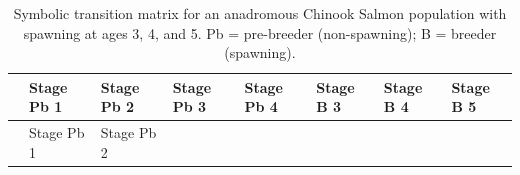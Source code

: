 \documentclass[
  letterpaper,
  DIV=11,
  numbers=noendperiod]{scrreprt}
\begin{document}
\begin{longtable}[]{@{}
  >{\raggedright\arraybackslash}p{}
  >{\raggedright\arraybackslash}p{}
  >{\raggedright\arraybackslash}p{}
  >{\raggedright\arraybackslash}p{}
  >{\raggedright\arraybackslash}p{}
  >{\raggedright\arraybackslash}p{}
  >{\raggedright\arraybackslash}p{}
  >{\raggedright\arraybackslash}p{}@{}}
\caption{Symbolic transition matrix for an anadromous Chinook Salmon
population with spawning at ages 3, 4, and 5. Pb = pre-breeder
(non-spawning); B = breeder (spawning).}\tabularnewline
\toprule\noalign{}
\begin{minipage}[b]{\linewidth}\raggedright
\end{minipage} & \begin{minipage}[b]{\linewidth}\raggedright
Stage Pb 1
\end{minipage} & \begin{minipage}[b]{\linewidth}\raggedright
Stage Pb 2
\end{minipage} & \begin{minipage}[b]{\linewidth}\raggedright
Stage Pb 3
\end{minipage} & \begin{minipage}[b]{\linewidth}\raggedright
Stage Pb 4
\end{minipage} & \begin{minipage}[b]{\linewidth}\raggedright
Stage B 3
\end{minipage} & \begin{minipage}[b]{\linewidth}\raggedright
Stage B 4
\end{minipage} & \begin{minipage}[b]{\linewidth}\raggedright
Stage B 5
\end{minipage} \\
\midrule\noalign{}
\endfirsthead
\toprule\noalign{}
\begin{minipage}[b]{\linewidth}\raggedright
\end{minipage} & \begin{minipage}[b]{\linewidth}\raggedright
Stage Pb 1
\end{minipage} & \begin{minipage}[b]{\linewidth}\raggedright
Stage Pb 2
\end{minipage} & \begin{minipage}[b]{\linewidth}\raggedright

\end{minipage}
\end{longtable}
\end{document}
